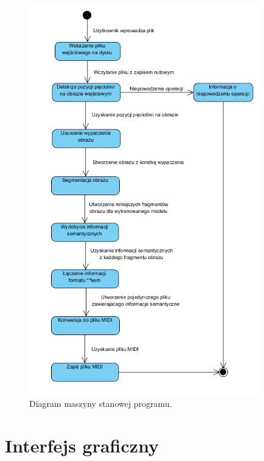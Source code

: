 \begin{figure}
	\centering
	\includegraphics[width=10cm]{images/diagram-maszyny-stanowej-programu.png}
	\caption{Diagram maszyny stanowej programu.}
	\label{fig:program-state-machine}
\end{figure}


\section{Interfejs graficzny}